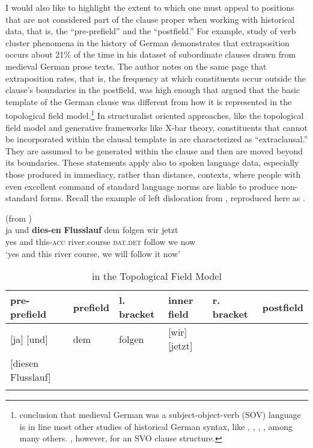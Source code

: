 I would also like to highlight the extent to which one must appeal to positions that are not considered part of the clause proper when working with historical data, that is, the “pre-prefield” and the “postfield.” For example,  study of verb cluster phenomena in the history of German demonstrates that extraposition occurs about 21\% of the time in his dataset of subordinate clauses drawn from medieval German prose texts. The author notes on the same page that extraposition rates, that is, the frequency at which constituents occur outside the clause’s boundaries in the postfield, was high enough that \citet[19]{Lehmann1971} argued that the basic template of the German clause was different from how it is represented in the topological field model.\footnote{{ conclusion that medieval German was a subject-object-verb (SOV) language is in line most other studies of historical German syntax, like \citet{Axel2007}, \citet{Axel-Tober2012}, \citet{Lenerz1984}, \citet{Lenerz1985}, among many others. \citet{Lehmann1971}, however, for an SVO clause structure.}} In structuralist oriented approaches, like the topological field model and generative frameworks like X-bar theory, constituents that cannot be incorporated within the clausal template in  are characterized as “extraclausal.” They are assumed to be generated within the clause and then are moved beyond its boundaries. These statements apply also to spoken language data, especially those produced in immediacy, rather than distance, contexts, where people with even excellent command of standard language norms are liable to produce non-standard forms. Recall the example of left dislocation from , reproduced here as .\largerpage[2]

\ea%
\label{ex:7:8}(from \citealt[240]{MillerWeinert1998})\\
\gll ja und \textbf{dies-en} \textbf{Flusslauf} dem folgen wir jetzt\\
yes and this-\textsc{acc} river.course \textsc{dat.det} follow we now\\
\glt ‘yes and this river course, we will follow it now’
\z

\begin{table}[H]
\small
\caption{ in the Topological Field Model}
\begin{tabular}{llllll}
\lsptoprule
pre-prefield & prefield & l. bracket & inner field & r. bracket & postfield\\
\midrule
{}[ja] [und]  & dem & folgen & [wir] [jetzt] &  & \\
{}[diesen Flusslauf]\\
\lspbottomrule
\end{tabular}
\end{table}

